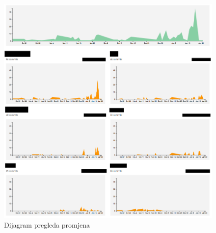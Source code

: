 		\begin{figure}[H]
			\centering
			\includegraphics[scale=0.6]{slike/aktivnost.png}
			\caption{Dijagram pregleda promjena}
		\end{figure}
		
		
		
	